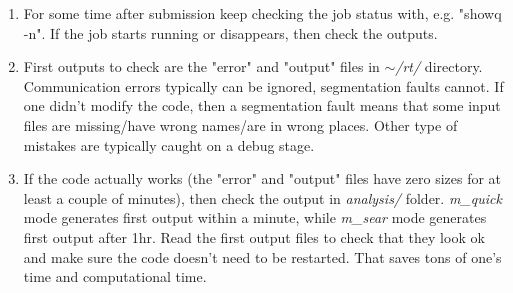 \documentclass{emulateapj}
\begin{document}
\begin{enumerate}
\item{For some time after submission keep checking the job status with, e.g. "showq -n". If the job starts running or disappears, then check the outputs.}
\item{First outputs to check are the "error" and "output" files in \textit{$\sim$/rt/} directory. Communication errors typically can be ignored, segmentation faults cannot. 
If one didn't modify the code, then a segmentation fault means that some input files are missing/have wrong names/are in wrong places.
Other type of mistakes are typically caught on a debug stage.}
\item{If the code actually works (the "error" and "output" files have zero sizes for at least a couple of minutes), then check the output in \textit{analysis/} folder.
\textit{m\_quick} mode generates first output within a minute, while \textit{m\_sear} mode generates first output after 1hr. Read the first output files to check that they look ok
and make sure the code doesn't need to be restarted. That saves tons of one's time and computational time.}
\end{enumerate}
\end{document}
